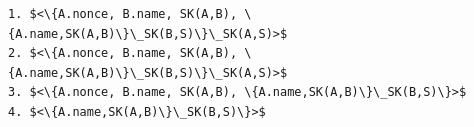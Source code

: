 \begin{lstlisting}[frame=single, mathescape, basicstyle=\footnotesize]
1. $<\{A.nonce, B.name, SK(A,B), \{A.name,SK(A,B)\}\_SK(B,S)\}\_SK(A,S)>$
2. $<\{A.nonce, B.name, SK(A,B), \{A.name,SK(A,B)\}\_SK(B,S)\}\_SK(A,S)>$
3. $<\{A.nonce, B.name, SK(A,B), \{A.name,SK(A,B)\}\_SK(B,S)\}>$
4. $<\{A.name,SK(A,B)\}\_SK(B,S)\}>$
\end{lstlisting}


    

